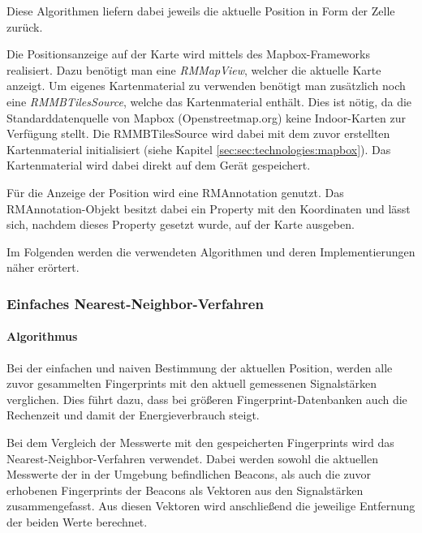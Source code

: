 Diese Algorithmen liefern dabei jeweils die aktuelle Position in Form der Zelle zurück.

Die Positionsanzeige auf der Karte wird mittels des Mapbox-Frameworks realisiert. Dazu benötigt man eine \emph{RMMapView}, welcher die aktuelle Karte anzeigt. Um eigenes Kartenmaterial zu verwenden benötigt man zusätzlich noch eine \emph{RMMBTilesSource}, welche das Kartenmaterial enthält. Dies ist nötig, da die Standarddatenquelle von Mapbox (Openstreetmap.org) keine Indoor-Karten zur Verfügung stellt. Die RMMBTilesSource wird dabei mit dem zuvor erstellten Kartenmaterial initialisiert (siehe Kapitel \ref{sec:sec:technologies:mapbox}). Das Kartenmaterial wird dabei direkt auf dem Gerät gespeichert. 

Für die Anzeige der Position wird eine RMAnnotation genutzt. Das RMAnnotation-Objekt besitzt dabei ein Property mit den Koordinaten und lässt sich, nachdem dieses Property gesetzt wurde, auf der Karte ausgeben.

Im Folgenden werden die verwendeten Algorithmen und deren Implementierungen näher erörtert.


\subsubsection{Einfaches Nearest-Neighbor-Verfahren}
\label{sec:}

\paragraph{Algorithmus}
\label{sec:}
Bei der einfachen und naiven Bestimmung der aktuellen Position, werden alle zuvor gesammelten Fingerprints mit den aktuell gemessenen Signalstärken verglichen. Dies führt dazu, dass bei größeren Fingerprint-Datenbanken auch die Rechenzeit und damit der Energieverbrauch steigt. 

Bei dem Vergleich der Messwerte mit den gespeicherten Fingerprints wird das Nearest-Neighbor-Verfahren verwendet. Dabei werden sowohl die aktuellen Messwerte der in der Umgebung befindlichen Beacons, als auch die zuvor erhobenen Fingerprints der Beacons als Vektoren aus den Signalstärken zusammengefasst. Aus diesen Vektoren wird anschließend die jeweilige Entfernung der beiden Werte berechnet. 

